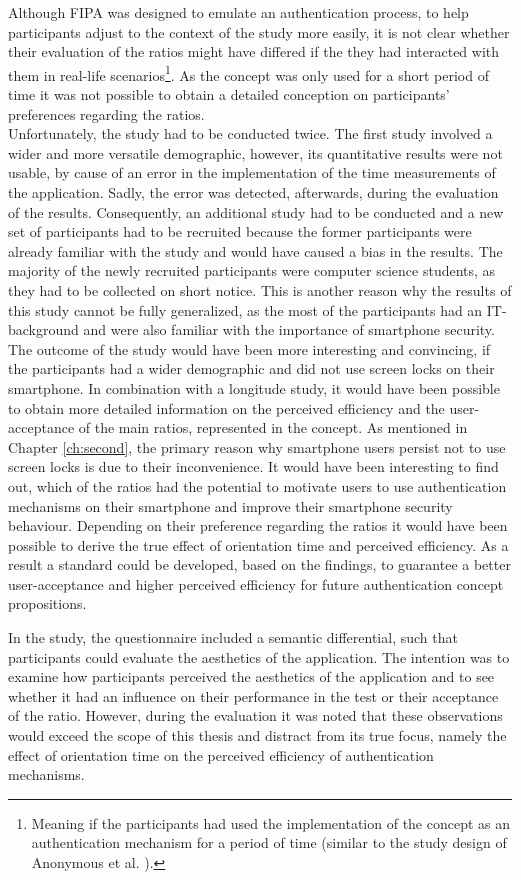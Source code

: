 Although FIPA was designed to emulate an authentication process, to help participants adjust to the context of the study more easily, it is not clear whether their evaluation of the ratios might have differed if the they had interacted with them in real-life scenarios\footnote{Meaning if the participants had used the implementation of the concept as an authentication mechanism for a period of time (similar to the study design of Anonymous et al. \cite{anonymous}).}. As the concept was only used for a short period of time it was not possible to obtain a detailed conception on participants' preferences regarding the ratios.\\
Unfortunately, the study had to be conducted twice. The first study involved a wider and more versatile demographic, however, its quantitative results were not usable, by cause of an error in the implementation of the time measurements of the application. Sadly, the error was detected, afterwards, during the evaluation of the results. Consequently, an additional study had to be conducted and a new set of participants had to be recruited because the former participants were already familiar with the study and would have caused a bias in the results. The majority of the newly recruited participants were computer science students, as they had to be collected on short notice. This is another reason why the results of this study cannot be fully generalized, as the most of the participants had an IT-background and were also familiar with the importance of smartphone security. The outcome of the study would have been more interesting and convincing, if the participants had a wider demographic and did not use screen locks on their smartphone. In combination with a longitude study, it would have been possible to obtain more detailed information on the perceived efficiency and the user-acceptance of the main ratios, represented in the concept. As mentioned in Chapter \ref{ch:second}, the primary reason why smartphone users persist not to use screen locks is due to their inconvenience. It would have been interesting to find out, which of the ratios had the potential to motivate users to use authentication mechanisms on their smartphone and improve their smartphone security behaviour. Depending on their preference regarding the ratios it would have been possible to derive the true effect of orientation time and perceived efficiency. As a result a standard could be developed, based on the findings, to guarantee a better user-acceptance and higher perceived efficiency for future authentication concept propositions.

In the study, the questionnaire included a semantic differential, such that participants could evaluate the aesthetics of the application. The intention was to examine how participants perceived the aesthetics of the application and to see whether it had an influence on their performance in the test or their acceptance of the ratio. However, during the evaluation it was noted that these observations would exceed the scope of this thesis and distract from its true focus, namely the effect of orientation time on the perceived efficiency of authentication mechanisms.  
